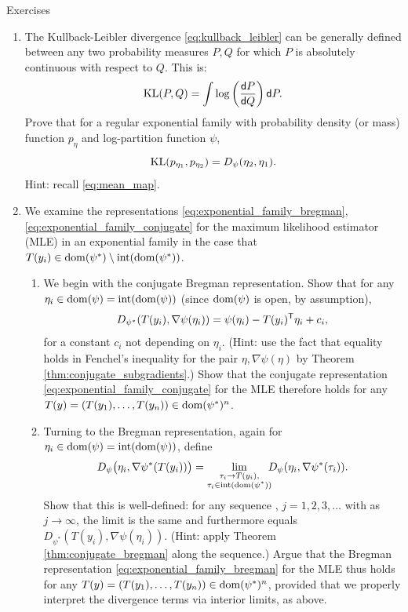 \begin{xcb}{Exercises}
\begin{enumerate}[label=\thechapter.\arabic*]
\item The Kullback-Leibler divergence \eqref{eq:kullback_leibler} can be
  generally defined between any two probability measures $P,Q$ for which $P$
  is absolutely continuous with respect to $Q$. This is: 
  \[
  \operatorname{KL}(P,Q) = \int \log\bigg( \frac{\mathsf{d}{P}}{\mathsf{d}{Q}} \bigg) \, \mathsf{d}{P}.
  \]
  Prove that for a regular exponential family with probability density (or mass)
  function $p_\eta$ and log-partition function $\psi$, 
  \[
  \operatorname{KL}(p_{\eta_1}, p_{\eta_2}) = D_\psi(\eta_2, \eta_1).
  \]
  Hint: recall \eqref{eq:mean_map}.

\item \label{ex:exponential_family_boundary}
  We examine the representations \eqref{eq:exponential_family_bregman},
  \eqref{eq:exponential_family_conjugate} for the maximum likelihood estimator 
  (MLE) in an exponential family in the case that $T(y_i) \in \operatorname{dom}(\psi^*)
  \setminus \operatorname{int}(\operatorname{dom}(\psi^*))$.  

\begin{enumerate}[label=\alph*.]
\item We begin with the conjugate Bregman representation. Show that for any
  $\eta_i \in \operatorname{dom}(\psi) = \operatorname{int}(\operatorname{dom}(\psi))$ (since $\operatorname{dom}(\psi)$ is open,
  by assumption),  
  \[
  D_{\psi^*}(T(y_i), \nabla\psi(\eta_i)) = \psi(\eta_i) - T(y_i)^{\mathsf{T}} \eta_i + c_i,
  \]
  for a constant $c_i$ not depending on $\eta_i$. (Hint: use the fact that
  equality holds in Fenchel's inequality for the pair $\eta, \nabla\psi(\eta)$ 
  by Theorem \ref{thm:conjugate_subgradients}.) Show that the conjugate
  representation \eqref{eq:exponential_family_conjugate} for the MLE therefore
  holds for any $T(y) = (T(y_1), \dots, T(y_n)) \in \operatorname{dom}(\psi^*)^n$.     

\item Turning to the Bregman representation, again for $\eta_i \in \operatorname{dom}(\psi)
  = \operatorname{int}(\operatorname{dom}(\psi))$, define  
  \[
  D_\psi\big( \eta_i, \nabla\psi^*(T(y_i)) \big) = \lim_{\substack{\tau_i \to 
      T(y_i), \\ \tau_i \in \operatorname{int}(\operatorname{dom}(\psi^*))}} \hspace{-5pt}
  D_\psi(\eta_i, \nabla\psi^*(\tau_i)). 
  \]
  Show that this is well-defined: for any sequence , $j=1,2,3,\dots$ with  as $j \to \infty$, the limit is the same and furthermore equals 
  $D_{\psi^*}(T(y_i), \nabla\psi(\eta_i))$. (Hint: apply Theorem
  \ref{thm:conjugate_bregman} along the sequence.) Argue that the Bregman
  representation \eqref{eq:exponential_family_bregman} for the MLE thus holds
  for any $T(y) = (T(y_1), \dots, T(y_n)) \in \operatorname{dom}(\psi^*)^n$, provided that we
  properly interpret the divergence terms via interior limits, as above.  
\end{enumerate}


\end{enumerate}
\end{xcb}
